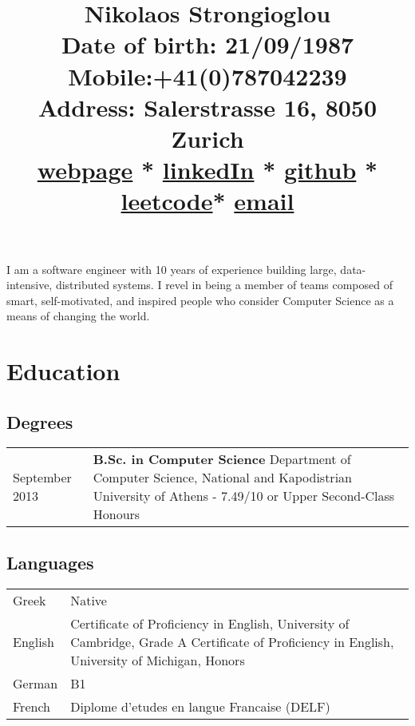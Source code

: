 \documentclass{article}
\begin{document}
	\title{\Huge{\vspace{-3.5cm} \color{NavyBlue}Nikolaos Strongioglou } \\ \small{\textbf{Date of birth}: 21/09/1987\\
			\textbf{Mobile}:+41(0)787042239\\
			\textbf{Address}: Salerstrasse 16, 8050 Zurich\\
			\href{http://tonyflow.github.io/}{webpage} * \href{https://www.linkedin.com/in/nikolaos-strongioglou/}{linkedIn} * \href{https://github.com/tonyflow}{github} * \href{https://leetcode.com/nikostr/}{leetcode}* \href{mailto:nikos.strongioglou@gmail.com}{email}
		} }
	\author{}
	\date{}
	\maketitle
	
	\vspace{-1.4cm}
	\noindent
	I am a software engineer with 10 years of experience building large, data-intensive, distributed systems. I revel in being a member of teams composed of smart, self-motivated, and inspired people who consider Computer Science as a means of changing the world.

	\section*{\color{NavyBlue} Education}
	\vspace{-0.5cm}
	{\color{NavyBlue} \hrulefill}
	
	\subsection*{Degrees}
	\begin{tabular}{p{2cm}  p{12cm}}
		\small September 2013 & \textbf{B.Sc. in Computer Science} \newline
			Department of Computer Science, National and Kapodistrian University of Athens - 7.49/10 or Upper Second-Class Honours
	\end{tabular}

	\subsection*{Languages}
		\begin{tabular}{p{2cm}  p{12cm}}
			Greek & Native \\
			English & Certificate of Proficiency in English, University of Cambridge, Grade A \newline
							Certificate of Proficiency in English, University of Michigan, Honors \\
			German & B1 \\
			French & Diplome d’etudes en langue Francaise (DELF) 
		\end{tabular}
\end{document}
